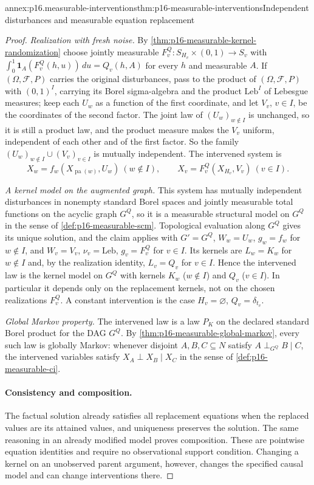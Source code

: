 \begin{annexitem}{annex:p16.measurable-interventions}{thm:p16-measurable-interventions}{Independent disturbances and measurable equation replacement}
\begin{proof}
\emph{Realization with fresh noise.} By
\cref{thm:p16-measurable-kernel-randomization} choose jointly measurable
\(F^Q_v:S_{H_v}\times(0,1)\to S_v\) with
\(\int_0^1\mathbf 1_A(F^Q_v(h,u))\,du=Q_v(h,A)\) for every \(h\) and
measurable \(A\). If \((\Omega,\mathcal F,P)\) carries the original
disturbances, pass to the product of \((\Omega,\mathcal F,P)\) with
\((0,1)^I\), carrying its Borel sigma-algebra and the product
\(\mathrm{Leb}^I\) of Lebesgue measures; keep each \(U_w\) as a function of the first
coordinate, and let \(V_v\), \(v\in I\), be the coordinates of the second
factor. The joint law of \((U_w)_{w\notin I}\) is unchanged, so it is
still a product law, and the product measure makes the \(V_v\) uniform,
independent of each other and of the first factor. So the family
\((U_w)_{w\notin I}\cup(V_v)_{v\in I}\) is mutually independent. The
intervened system is
\[
 X_w=f_w(X_{\operatorname{pa}(w)},U_w)\ (w\notin I),\qquad
 X_v=F^Q_v(X_{H_v},V_v)\ (v\in I).
\]

\emph{A kernel model on the augmented graph.} This system has mutually
independent disturbances in nonempty standard Borel spaces and jointly
measurable total functions on the acyclic graph \(G^Q\), so it is a
measurable structural model on \(G^Q\) in the sense of
\cref{def:p16-measurable-scm}. Topological evaluation along \(G^Q\) gives
its unique solution, and the claim applies with \(G'=G^Q\),
\(W_w=U_w\), \(g_w=f_w\) for \(w\notin I\), and \(W_v=V_v\),
\(\nu_v=\mathrm{Leb}\), \(g_v=F^Q_v\) for \(v\in I\). Its kernels are
\(L_w=K_w\) for \(w\notin I\) and, by the realization identity,
\(L_v=Q_v\) for \(v\in I\). Hence the intervened law is the kernel model
on \(G^Q\) with kernels \(K_w\) (\(w\notin I\)) and \(Q_v\) (\(v\in I\)).
In particular it depends only on the replacement kernels, not on the
chosen realizations \(F^Q_v\). A constant intervention is the case
\(H_v=\varnothing\), \(Q_v=\delta_{t_v}\).

\emph{Global Markov property.} The intervened law is a law \(P_K\) on the
declared standard Borel product for the DAG \(G^Q\). By
\cref{thm:p16-measurable-global-markov}, every such law is globally
Markov: whenever disjoint \(A,B,C\subseteq N\) satisfy
\(A\mathrel{\perp_{G^Q}}B\mid C\), the intervened variables satisfy
\(X_A\perp X_B\mid X_C\) in the sense of \cref{def:p16-measurable-ci}.

\paragraph{Consistency and composition.}
The factual solution already satisfies
all replacement equations when the replaced values are its attained
values, and uniqueness preserves the solution. The same reasoning
in an already modified model proves composition. These are pointwise
equation identities and require no observational support condition.
Changing a kernel on an unobserved parent argument, however, changes
the specified causal model and can change interventions there.
\end{proof}
\end{annexitem}

